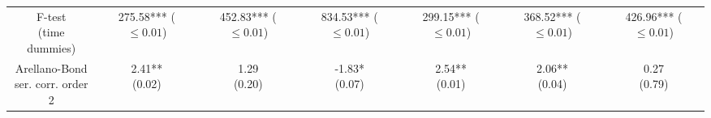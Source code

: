 \begin{tabular}{ccccccc}
             \makecell{F-test\\(time dummies)} &   \makecell{275.58***\\($\leq 0.01$)} &   \makecell{452.83***\\($\leq 0.01$)} &   \makecell{834.53***\\($\leq 0.01$)} &   \makecell{299.15***\\($\leq 0.01$)} &   \makecell{368.52***\\($\leq 0.01$)} &   \makecell{426.96***\\($\leq 0.01$)} \\
 \makecell{Arellano-Bond\\ser. corr.  order 2} &             \makecell{2.41**\\(0.02)} &               \makecell{1.29\\(0.20)} &             \makecell{-1.83*\\(0.07)} &             \makecell{2.54**\\(0.01)} &             \makecell{2.06**\\(0.04)} &               \makecell{0.27\\(0.79)} \\
\bottomrule
\end{tabular}

